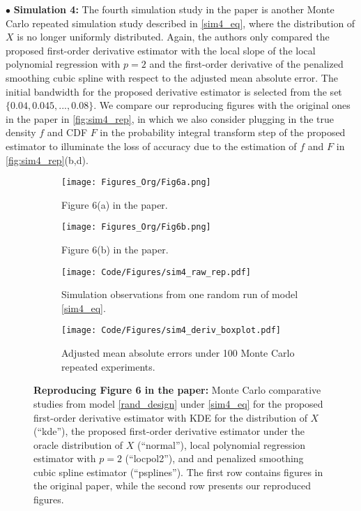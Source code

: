 \documentclass{uwstat572}
\theoremstyle{definition}
\theoremstyle{theorem}
\begin{document}
$\bullet$ {\bf Simulation 4:} The fourth simulation study in the paper \citep{liu2020smoothed} is another Monte Carlo repeated simulation study described in \eqref{sim4_eq}, where the distribution of $X$ is no longer uniformly distributed. Again, the authors only compared the proposed first-order derivative estimator with the local slope of the local polynomial regression with $p=2$ and the first-order derivative of the penalized smoothing cubic spline with respect to the adjusted mean absolute error. The initial bandwidth for the proposed derivative estimator is selected from the set $\{0.04, 0.045,...,0.08\}$. We compare our reproducing figures with the original ones in the paper in \autoref{fig:sim4_rep}, in which we also consider plugging in the true density $f$ and CDF $F$ in the probability integral transform step of the proposed estimator to illuminate the loss of accuracy due to the estimation of $f$ and $F$ in \autoref{fig:sim4_rep}(b,d).

\begin{figure}[!t]
	\captionsetup[subfigure]{justification=centering}
	\begin{subfigure}[t]{0.49\linewidth}
		\centering
		\texttt{[image: Figures\_Org/Fig6a.png]}
		\caption{Figure 6(a) in the paper.}
	\end{subfigure}
	\hfil
	\begin{subfigure}[t]{0.49\linewidth}
		\centering
		\texttt{[image: Figures\_Org/Fig6b.png]}
		\caption{Figure 6(b) in the paper.}
	\end{subfigure}
	\begin{subfigure}[t]{0.49\linewidth}
		\centering
		\texttt{[image: Code/Figures/sim4\_raw\_rep.pdf]}
		\caption{Simulation observations from one random run of model \eqref{sim4_eq}.}
	\end{subfigure}
	\hfil
	\begin{subfigure}[t]{0.49\linewidth}
		\centering
		\texttt{[image: Code/Figures/sim4\_deriv\_boxplot.pdf]}
		\caption{Adjusted mean absolute errors under 100 Monte Carlo repeated experiments.}
	\end{subfigure}
	\caption{{\bf Reproducing Figure 6 in the paper:} Monte Carlo comparative studies from model \eqref{rand_design} under \eqref{sim4_eq} for the proposed first-order derivative estimator with KDE for the distribution of $X$ (``kde''), the proposed first-order derivative estimator under the oracle distribution of $X$ (``normal''), local polynomial regression estimator with $p=2$ (``locpol2''), and and penalized smoothing cubic spline estimator (``psplines''). The first row contains figures in the original paper, while the second row presents our reproduced figures.}
	\label{fig:sim4_rep}
\end{figure}
\end{document}
